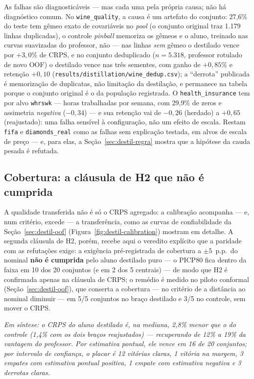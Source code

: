 As falhas são diagnosticáveis --- mas cada uma pela própria causa; não
há diagnóstico comum. No \texttt{wine\_quality},
a causa é um artefato do conjunto: 27,6\% do teste tem gêmeo exato de
covariáveis no \emph{pool} (o conjunto original traz 1.179 linhas
duplicadas), o controle \emph{pinball} memoriza os gêmeos e o aluno,
treinado nas curvas suavizadas do professor, não --- nas linhas
\emph{sem} gêmeo o destilado vence por $+3{,}0\%$ de CRPS, e no
conjunto deduplicado ($n=5.318$, professor rotulado de novo OOF) o
destilado vence nas três sementes, com ganho de $+0{,}85\%$ e
retenção $+0{,}10$
(\texttt{results/\allowbreak distillation/\allowbreak wine\_\allowbreak dedup.csv});
a ``derrota'' publicada é memorização de duplicatas, não limitação da
destilação, e permanece na tabela porque o conjunto original é o da
população registrada. O \texttt{health\_\allowbreak insurance} tem por alvo
\texttt{whrswk} --- horas trabalhadas por semana, com 29,9\% de zeros
e assimetria \emph{negativa} ($-0{,}34$) --- e sua retenção vai de
$-0{,}26$ (herdado) a $+0{,}65$ (reajustado): uma falha sensível à
configuração, não um efeito de escala. Restam \texttt{fifa} e
\texttt{diamonds\_\allowbreak real} como as falhas sem explicação
testada, em alvos de escala de preço --- e, para elas, a
Seção~\ref{sec:destil-regra} mostra que a hipótese da cauda pesada
é refutada.

\subsection{Cobertura: a cláusula de H2 que não é cumprida}
\label{sec:destil-cobertura}

A qualidade transferida não é só o CRPS agregado: a calibração
acompanha --- e, num critério, excede --- a transferência, como as
curvas de confiabilidade da Seção~\ref{sec:destil-oof}
(Figura~\ref{fig:destil-calibration}) mostram em detalhe. A segunda
cláusula de H2, porém, recebe aqui o veredito explícito que a paridade
com as refutações exige: a exigência pré-registrada de cobertura a
$\pm 5$~p.p.\ do nominal \textbf{não é cumprida} pelo aluno destilado
puro --- o PICP80 fica dentro da faixa em 10 dos 20 conjuntos (e em 2
dos 5 centrais) --- de modo que H2 é confirmada apenas na cláusula de
CRPS; o remédio é medido no piloto conformal
(Seção~\ref{sec:destil-oof}), que conserta a cobertura --- no critério
de a distância ao nominal diminuir --- em 5/5 conjuntos no braço
destilado e 3/5 no controle, sem mover o CRPS.

\emph{Em síntese: o CRPS do aluno destilado é, na mediana, 2,8\%
menor que o do controle (1,4\% com os dois braços reajustados) ---
recuperando de 12\% a 19\% da vantagem do professor. Por estimativa
pontual, ele vence em 16 de 20 conjuntos; por intervalo de
confiança, o placar é 12 vitórias claras, 1 vitória na margem, 3
empates com estimativa pontual positiva, 1 empate com estimativa
negativa e 3 derrotas claras.}

